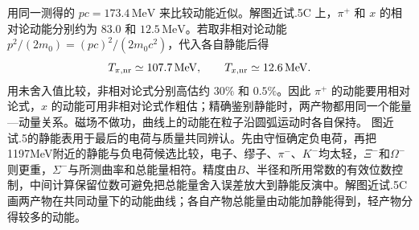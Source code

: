 \documentclass[UTF8,fontset=fandol,a4paper,11pt]{ctexart}
\begin{document}
用同一测得的 $pc=173.4\,\mathrm{MeV}$ 来比较动能近似。解图近试.5C 上，$\pi^+$ 和 $x$ 的相对论动能分别约为 $83.0$ 和 $12.5\,\mathrm{MeV}$。若取非相对论动能 $p^2/(2m_0)=(pc)^2/(2m_0c^2)$，代入各自静能后得
\[
T_{\pi,{\rm nr}}\simeq107.7\,\mathrm{MeV},\qquad
T_{x,{\rm nr}}\simeq12.6\,\mathrm{MeV}.
\]
用未舍入值比较，非相对论式分别高估约 $30\%$ 和 $0.5\%$。因此 $\pi^+$ 的动能要用相对论式，$x$ 的动能可用非相对论式作粗估；精确鉴别静能时，两产物都用同一个能量—动量关系。磁场不做功，曲线上的动能在粒子沿圆弧运动时各自保持。
图近试.5的静能表用于最后的电荷与质量共同辨认。先由守恒确定负电荷，再把1197MeV附近的静能与负电荷候选比较，电子、缪子、$\pi^-$、$K^-$均太轻，$\Xi^-$和$\Omega^-$则更重，$\Sigma^-$与所测曲率和总能量相符。精度由$B$、半径和所用常数的有效位数控制，中间计算保留位数可避免把总能量舍入误差放大到静能反演中。解图近试.5C画两产物在共同动量下的动能曲线；各自产物总能量由动能加静能得到，轻产物分得较多的动能。
\end{document}
